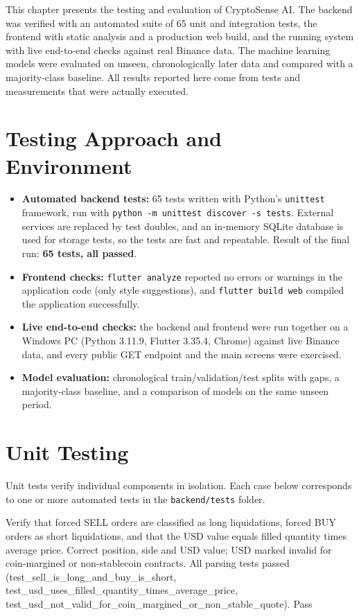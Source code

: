 
\chapteroverview
This chapter presents the testing and evaluation of CryptoSense AI. The backend was verified with an automated suite of 65 unit and integration tests, the frontend with static analysis and a production web build, and the running system with live end-to-end checks against real Binance data. The machine learning models were evaluated on unseen, chronologically later data and compared with a majority-class baseline. All results reported here come from tests and measurements that were actually executed.

\section{Testing Approach and Environment}
\begin{itemize}
\item \textbf{Automated backend tests:} 65 tests written with Python's \texttt{unittest} framework, run with \texttt{python -m unittest discover -s tests}. External services are replaced by test doubles, and an in-memory SQLite database is used for storage tests, so the tests are fast and repeatable. Result of the final run: \textbf{65 tests, all passed}.
\item \textbf{Frontend checks:} \texttt{flutter analyze} reported no errors or warnings in the application code (only style suggestions), and \texttt{flutter build web} compiled the application successfully.
\item \textbf{Live end-to-end checks:} the backend and frontend were run together on a Windows PC (Python 3.11.9, Flutter 3.35.4, Chrome) against live Binance data, and every public GET endpoint and the main screens were exercised.
\item \textbf{Model evaluation:} chronological train/validation/test splits with gaps, a majority-class baseline, and a comparison of models on the same unseen period.
\end{itemize}

\section{Unit Testing}
Unit tests verify individual components in isolation. Each case below corresponds to one or more automated tests in the \texttt{backend/tests} folder.

{Verify that forced SELL orders are classified as long liquidations, forced BUY orders as short liquidations, and that the USD value equals filled quantity times average price.}
{Correct position, side and USD value; USD marked invalid for coin-margined or non-stablecoin contracts.}
{All parsing tests passed (test\_sell\_is\_long\_and\_buy\_is\_short, test\_usd\_uses\_filled\_quantity\_times\_average\_price, test\_usd\_not\_valid\_for\_coin\_margined\_or\_non\_stable\_quote).}
{Pass}

